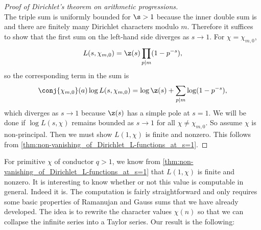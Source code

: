 \begin{proof}[Proof of Dirichlet's theorem on arithmetic progressions]
\[        \]
        The triple sum is uniformly bounded for $\s > 1$ because the inner double sum is and there are finitely many Dirichlet characters modulo $m$. Therefore it suffices to show that the first sum on the left-hand side diverges as $s \to 1$. For $\chi = \chi_{m,0}$,
        \[
          L(s,\chi_{m,0}) = \z(s)\prod_{p \mid m}(1-p^{-s}),
        \]
        so the corresponding term in the sum is
        \[
          \conj{\chi_{m,0}}(a)\log L(s,\chi_{m,0}) = \log\z(s)+\sum_{p \mid m}\log(1-p^{-s}),
        \]
        which diverges as $s \to 1$ because $\z(s)$ has a simple pole at $s = 1$. We will be done if $\log{L(s,\chi)}$ remains bounded as $s \to 1$ for all $\chi \neq \chi_{m,0}$. So assume $\chi$ is non-principal. Then we must show $L(1,\chi)$ is finite and nonzero. This follows from \cref{thm:non-vanishing_of_Dirichlet_L-functions_at_s=1}.
    \end{proof}

    For primitive $\chi$ of conductor $q > 1$, we know from \cref{thm:non-vanishing_of_Dirichlet_L-functions_at_s=1} that $L(1,\chi)$ is finite and nonzero. It is interesting to know whether or not this value is computable in general. Indeed it is. The computation is fairly straightforward and only requires some basic properties of Ramanujan and Gauss sums that we have already developed. The idea is to rewrite the character values $\chi(n)$ so that we can collapse the infinite series into a Taylor series. Our result is the following:
    
